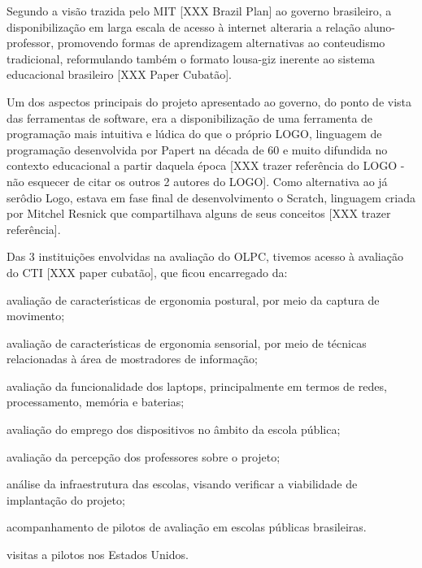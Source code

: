 \documentclass[
12pt,		%
openright,	%
twoside,  %
a4paper,			%
chapter=TITLE,		%
english,			%
french,				%
spanish,			%
brazil				%
]{USPSC-classe/USPSC}
\begin{document}
Segundo a vis\~ao trazida pelo MIT [XXX Brazil Plan] ao governo brasileiro, a disponibiliza\c{c}\~ao em larga escala de acesso \`a internet alteraria a rela\c{c}\~ao aluno-professor, promovendo formas de aprendizagem alternativas ao conteudismo tradicional, reformulando tamb\'em o formato lousa-giz inerente ao sistema educacional brasileiro [XXX Paper Cubat\~ao].










Um dos aspectos principais do projeto apresentado ao governo, do ponto de vista das ferramentas de software, era a disponibiliza\c{c}\~ao de uma ferramenta de programa\c{c}\~ao mais intuitiva e l\'udica do que o pr\'oprio LOGO, linguagem de programa\c{c}\~ao desenvolvida por Papert na d\'ecada de 60 e muito difundida no contexto educacional a partir daquela \'epoca [XXX trazer refer\^encia do LOGO - n\~ao esquecer de citar os outros 2 autores do LOGO]. Como alternativa ao j\'a ser\^odio Logo, estava em fase final de desenvolvimento o Scratch, linguagem criada por Mitchel Resnick que compartilhava alguns de seus conceitos [XXX trazer refer\^encia].










Das 3 institui\c{c}\~oes envolvidas na avalia\c{c}\~ao do OLPC, tivemos acesso \`a avalia\c{c}\~ao do CTI [XXX paper cubat\~ao], que ficou encarregado da:











\begin{alineas}
\item avalia\c{c}\~ao de caracter\'{\i}sticas de ergonomia postural, por meio da captura de movimento;
\item avalia\c{c}\~ao de caracter\'{\i}sticas de ergonomia sensorial, por meio de t\'ecnicas relacionadas \`a \'area de mostradores de informa\c{c}\~ao;
\item avalia\c{c}\~ao da funcionalidade dos \textquotedbl laptops, principalmente em termos de redes, processamento, mem\'oria e baterias;
\item avalia\c{c}\~ao do emprego dos dispositivos no \^ambito da escola p\'ublica;
\item avalia\c{c}\~ao da percep\c{c}\~ao dos professores sobre o projeto;
\item an\'alise da infraestrutura das escolas, visando verificar a viabilidade de implanta\c{c}\~ao do projeto;
\item acompanhamento de pilotos de avalia\c{c}\~ao em escolas p\'ublicas brasileiras.
\item visitas a pilotos nos Estados Unidos.
\end{alineas}
\end{document}
